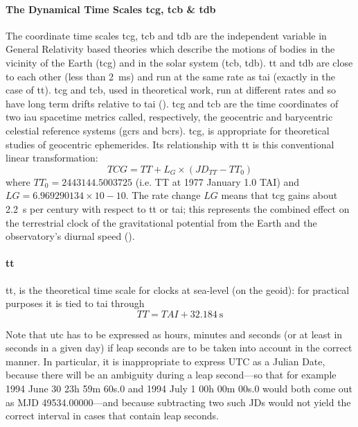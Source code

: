 \paragraph{The Dynamical Time Scales \gls{tcg}, \gls{tcb} \& \gls{tdb}}
\label{par:dynamical-time-scales}
The coordinate time scales \gls{tcg}, \gls{tcb} and \gls{tdb} are the independent
variable in General Relativity based theories which describe the motions of bodies in 
the vicinity of the Earth (\gls{tcg}) and in the solar system (\gls{tcb}, \gls{tdb}).
\gls{tt} and \gls{tdb} are close to each other (less than \SI{2}{\milli\second}) and 
run at the same rate as \gls{tai} (exactly in the case of \gls{tt}). \gls{tcg}
and \gls{tcb}, used in theoretical work, run at different rates and so have long 
term drifts relative to \gls{tai} (\cite{sofa2021ts}). \gls{tcg} and \gls{tcb} are 
the time coordinates of two \gls{iau} spacetime metrics called, respectively, the
geocentric and barycentric celestial reference systems (\gls{gcrs} and \gls{bcrs}).
\gls{tcg}, is appropriate for theoretical studies of geocentric ephemerides.
Its relationship with \gls{tt} is this conventional linear transformation:
\begin{equation}
    TCG = TT + L_G \times (JD_{TT} - TT_{0})
\end{equation}
where $TT_0 = 2443144.5003725$ (i.e. TT at 1977 January 1.0 TAI) and 
$LG = 6.969290134 \times 10-10$. The rate change $LG$ means that \gls{tcg} gains about
\SI{2.2}{\second} per century with respect to \gls{tt} or \gls{tai}; this represents 
the combined effect on the terrestrial clock of the gravitational potential from the 
Earth and the observatory's diurnal speed (\cite{sofa2021ts}).

\paragraph{\gls{tt}}\label{par:tt}
\gls{tt}, is the theoretical time scale for clocks at sea-level (on the geoid): for 
practical purposes it is tied to \gls{tai} through
\begin{equation}
    TT = TAI + \SI{32.184}{\second}
\end{equation}

Note that \gls{utc} has to be expressed as hours, minutes and seconds (or at least in seconds in a
given day) if leap seconds are to be taken into account in the correct manner. In particular, it
is inappropriate to express UTC as a Julian Date, because there will be an ambiguity during a
leap second—so that for example 1994 June 30 23h 59m 60s.0 and 1994 July 1 00h 00m 00s.0 would
both come out as MJD 49534.00000—and because subtracting two such JDs would not yield the
correct interval in cases that contain leap seconds.
